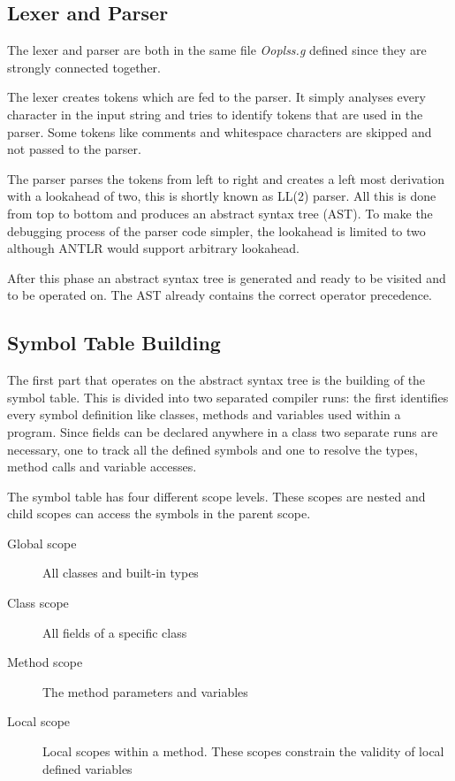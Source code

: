 \subsection{Lexer and Parser}
The lexer and parser are both in the same file \emph{Ooplss.g} defined
since they are strongly connected together. 

The lexer creates tokens which are fed to the parser. It simply
analyses every character in the input string and tries to identify tokens
that are used in the parser. Some tokens like comments and whitespace characters 
are skipped and not passed to the parser.

The parser parses the tokens from left to right and creates a left most
derivation with a lookahead of two, this is shortly known as LL(2) parser.
All this is done from top to bottom and produces  an 
abstract syntax tree (AST). To make the debugging
process of the parser code simpler, the lookahead is limited to two although ANTLR
would support arbitrary lookahead.

After this phase an abstract syntax tree is generated and ready to be visited
and to be operated on. The AST already contains the correct operator precedence.

\subsection{Symbol Table Building}
The first part that operates on the abstract syntax tree is the building of
the symbol table. This is divided into two separated compiler runs: the
first identifies every symbol definition like classes, methods and
variables used within a program. Since fields can be declared anywhere
in a class two separate runs are necessary, one to track all the defined
symbols and one to resolve the types, method calls and variable accesses.

The symbol table has four different scope levels. These scopes are nested
and child scopes can access the symbols in the parent scope.
\begin{description}
	\item[Global scope] All classes and built-in types
	\item[Class scope] All fields of a specific class
	\item[Method scope] The method parameters and variables
	\item[Local scope] Local scopes within a method. These scopes
	constrain the validity of local defined variables
\end{description}

